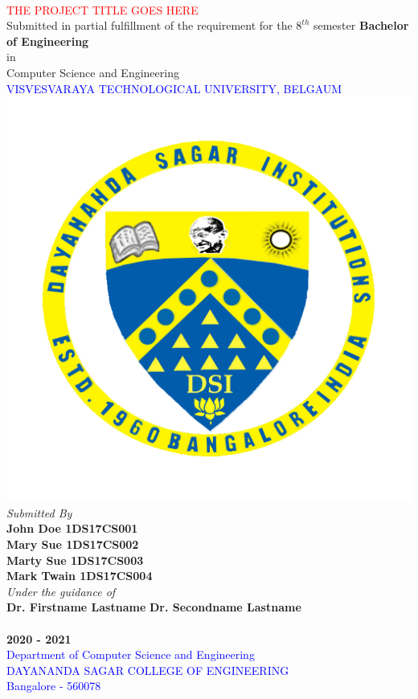 \documentclass[ 12pt,a4paper,twocolumn,fleqn]{article}
\begin{document}
\chead{}
\onecolumn
\begin{center}
 \\
\smallskip
\textcolor{red}{\LARGE{THE PROJECT TITLE GOES HERE}} \\
\large{Submitted in partial fulfillment of the requirement for the $8^{th}$ semester}
\large{\textbf{Bachelor of Engineering}} \\
\large{in} \\
\large{Computer Science and Engineering} \\
\textcolor{blue}{\LARGE{VISVESVARAYA TECHNOLOGICAL UNIVERSITY, BELGAUM}} \\
\includegraphics[scale=0.4]{media/DSCE-min.png} \\
\textit{Submitted By} \\
\textbf{John Doe \space 1DS17CS001} \\
\textbf{Mary Sue \space 1DS17CS002} \\
\textbf{Marty Sue \space 1DS17CS003} \\
\textbf{Mark Twain \space 1DS17CS004} \\
\textit{Under the guidance of} \\
\textbf{Dr. Firstname Lastname}
\hfill
\textbf{Dr. Secondname Lastname} \\
\hfill
{} \\
\Large{\textbf{2020 - 2021}} \\
\textcolor{blue}{\Large{Department of Computer Science and Engineering}} \\
\textcolor{blue}{\Large{DAYANANDA SAGAR COLLEGE OF ENGINEERING}} \\
\textcolor{blue}{\Large{Bangalore - 560078}} \\
\end{center}
\end{document}

